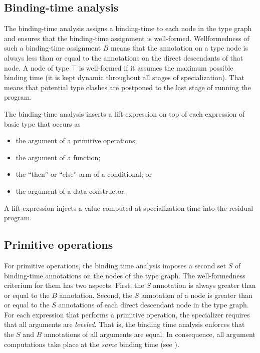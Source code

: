 \documentclass[11pt]{article}
\begin{document}
\subsection{Binding-time analysis}
\label{sec:binding-time-analysis}

The binding-time analysis assigns a binding-time to each node in the
type graph and ensures that the binding-time assignment is
well-formed. Wellformedness of such a binding-time assignment $B$
means that the annotation on a type node 
is always less than or equal to the annotations on the direct
descendants of that node. A node of type $\top$ is well-formed if it
assumes the maximum possible binding time (it is kept dynamic
throughout all stages of specialization). That means that potential
type clashes are postponed to the last stage of running the
program. 

The binding-time analysis inserts
a lift-expression on top of each expression of basic type that occurs
as
\begin{itemize}
\item the argument of a primitive operations;
\item the argument of a function;
\item the ``then'' or ``else'' arm of a conditional; or
\item the argument of a data constructor.
\end{itemize}
A lift-expression injects a value computed at specialization time into
the residual program.


\subsection{Primitive operations}
\label{sec:primitive-operations}

For primitive operations, the binding time analysis imposes a second
set $S$ of binding-time annotations on the nodes of the type graph. The
well-formedness criterium for them has two aspects. First, the $S$
annotation is always greater than or equal to the $B$
annotation. Second, the $S$ annotation of a node is greater than or
equal to the $S$ annotations of each direct descendant node in the
type graph. For each expression that performs a primitive operation,
the specializer requires that all arguments are \emph{leveled}. That is,
the binding time analysis enforces that the $S$ and $B$ annotations of
all arguments are equal. In consequence, all argument computations
take place at the \emph{same} binding time (see
\cite{Thiemann1996-reflection}). 
\end{document}
